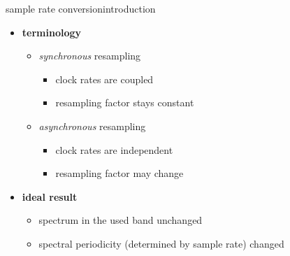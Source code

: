 	\begin{frame}{sample rate conversion}{introduction}
        \begin{itemize}
            \item   \textbf{terminology}
                \begin{itemize}
                    \item   \textit{synchronous} resampling
                        \begin{itemize}
                            \item   clock rates are coupled
                            \item   resampling factor stays constant
                        \end{itemize}
                    \pause
                    \item   \textit{asynchronous} resampling
                        \begin{itemize}
                            \item   clock rates are independent
                            \item   resampling factor may change
                        \end{itemize}
                \end{itemize}
            \bigskip
            \item   \textbf{ideal result}
                \begin{itemize}
                    \item   spectrum in the used band unchanged
                    \item   spectral periodicity (determined by sample rate) changed
                \end{itemize}
        \end{itemize}
    \end{frame}

